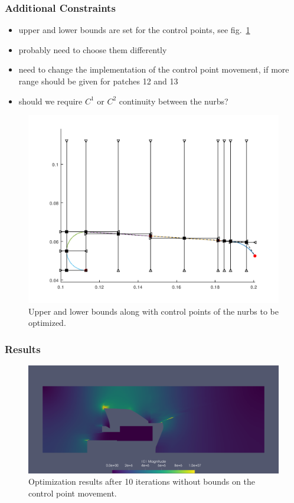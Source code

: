 \subsubsection{Additional Constraints}
\begin{itemize}
   \item upper and lower bounds are set for the control points, see fig.~\ref{fig:bounds}
   \item probably need to choose them differently
   \item need to change the implementation of the control point movement, if more range should be given for patches 12 and 13
   \item should we require $C^1$ or $C^2$ continuity between the nurbs?
\end{itemize}

\begin{center}
\begin{figure}[H]
  \includegraphics[width=\textwidth]{figures/200kV/bounds}
  \caption{Upper and lower bounds along with control points of the nurbs to be optimized.}
  \label{fig:bounds}
\end{figure}
\end{center}

\subsubsection{Results}
\begin{center}
\begin{figure}[H]
  \includegraphics[width=\textwidth]{figures/200kV/gradient_optim_run0}
  \caption{Optimization results after 10 iterations without bounds on the control point movement.}
\end{figure}
\end{center}

